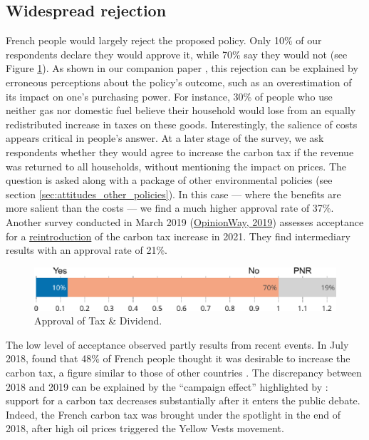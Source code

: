 \documentclass[english,5p,authoryear]{elsarticle}
\begin{document}
    \subsection{Widespread rejection}

%
French people would largely reject the proposed policy. Only 10\% of our respondents declare they would approve it, while 70\% say they would not (see Figure \ref{fig:approval}). As shown in our companion paper \citep{douenne_can_2019}, this rejection can be explained by erroneous perceptions about the policy's outcome, such as an overestimation of its impact on one's purchasing power. For instance, 30\% of people who use neither gas nor domestic fuel believe their household would lose from an equally redistributed increase in taxes on these goods. Interestingly, the salience of costs appears critical in people's answer. At a later stage of the survey, we ask respondents whether they would agree to increase the carbon tax if the revenue was returned to all households, without mentioning the impact on prices. The question is asked along with a package of other environmental policies (see section \ref{sec:attitudes_other_policies}). In this case --- where the benefits are more salient than the costs --- we find a much higher approval rate of 37\%. Another survey conducted in March 2019 (\href{https://drive.google.com/file/d/1ne1nUsJJqY1PYFOs9dH9uK6mLw39R1QY/view}{OpinionWay, 2019}) assesses acceptance for a \uline{reintroduction} of the carbon tax increase in 2021. They find intermediary results with an approval rate of 21\%. %

%

\begin{figure}[t]
\centering
\includegraphics[width=\columnwidth]{Images_EPS/approval_trim.eps}
\caption{Approval of Tax \& Dividend.}
\label{fig:approval}
\end{figure}
%

%

The low level of acceptance observed partly results from recent events. In July 2018, \citet{ademe_representations_2018} found that 48\% of French people thought it was desirable to increase the carbon tax, a figure similar to those of other countries \citep{brechin_public_2010}. The discrepancy between 2018 and 2019 can be explained by the ``campaign effect'' highlighted by \citet{anderson_can_2019}: support for a carbon tax decreases substantially after it enters the public debate. Indeed, the French carbon tax was brought under the spotlight in the end of 2018, after high oil prices triggered the Yellow Vests movement.
%
%
%
\end{document}
